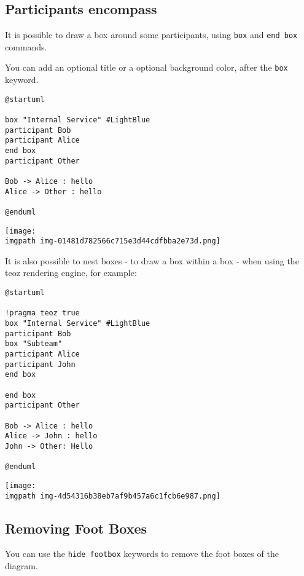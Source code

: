 %
%
\subsection{Participants encompass}






It is possible to draw a box around some participants, using \texttt{box}
and \texttt{end box} commands.


You can add an optional title or a
optional background color, after the \texttt{box} keyword.


\begin{verbatim}
@startuml

box "Internal Service" #LightBlue
participant Bob
participant Alice
end box
participant Other

Bob -> Alice : hello
Alice -> Other : hello

@enduml
\end{verbatim}
\begin{center}
\texttt{[image: \\imgpath img-01481d782566c715e3d44cdfbba2e73d.png]}
\end{center}




It is also possible to nest boxes - to draw a box within a box - when using the teoz rendering engine, for example:


\begin{verbatim}
@startuml

!pragma teoz true
box "Internal Service" #LightBlue
participant Bob
box "Subteam"
participant Alice
participant John
end box

end box
participant Other

Bob -> Alice : hello
Alice -> John : hello
John -> Other: Hello

@enduml
\end{verbatim}
\begin{center}
\texttt{[image: \\imgpath img-4d54316b38eb7af9b457a6c1fcb6e987.png]}
\end{center}
%
%
\subsection{Removing Foot Boxes}


You can use the \texttt{hide footbox} keywords to remove the foot boxes
of the diagram.


